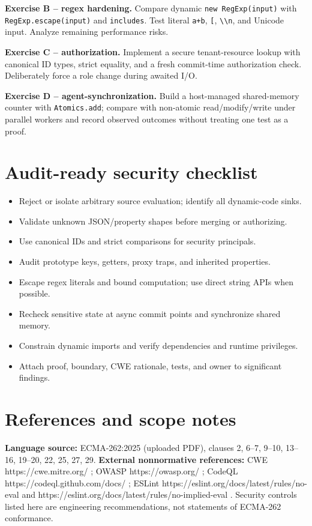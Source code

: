 \documentclass[11pt,letterpaper]{article}
\providecommand{\tightlist}{\setlength{\itemsep}{0pt}\setlength{\parskip}{0pt}}
\newcommand{\passthrough}[1]{#1}
\begin{document}
\textbf{Exercise B -- regex hardening.} Compare dynamic \passthrough{\lstinline!new RegExp(input)!} with \passthrough{\lstinline!RegExp.escape(input)!} and \passthrough{\lstinline!includes!}. Test literal \passthrough{\lstinline!a+b!}, \passthrough{\lstinline![!}, \passthrough{\lstinline!\\n!}, and Unicode input. Analyze remaining performance risks.

\textbf{Exercise C -- authorization.} Implement a secure tenant-resource lookup with canonical ID types, strict equality, and a fresh commit-time authorization check. Deliberately force a role change during awaited I/O.

\textbf{Exercise D -- agent-synchronization.} Build a host-managed shared-memory counter with \passthrough{\lstinline!Atomics.add!}; compare with non-atomic read/modify/write under parallel workers and record observed outcomes without treating one test as a proof.

\section{Audit-ready security checklist}\label{audit-ready-security-checklist}

\begin{itemize}
\tightlist
\item[$\square$]
  Reject or isolate arbitrary source evaluation; identify all dynamic-code sinks.
\item[$\square$]
  Validate unknown JSON/property shapes before merging or authorizing.
\item[$\square$]
  Use canonical IDs and strict comparisons for security principals.
\item[$\square$]
  Audit prototype keys, getters, proxy traps, and inherited properties.
\item[$\square$]
  Escape regex literals and bound computation; use direct string APIs when possible.
\item[$\square$]
  Recheck sensitive state at async commit points and synchronize shared memory.
\item[$\square$]
  Constrain dynamic imports and verify dependencies and runtime privileges.
\item[$\square$]
  Attach proof, boundary, CWE rationale, tests, and owner to significant findings.
\end{itemize}

\section{References and scope notes}\label{references-and-scope-notes}

\textbf{Language source:} ECMA-262:2025 (uploaded PDF), clauses 2, 6--7, 9--10, 13--16, 19--20, 22, 25, 27, 29. \textbf{External nonnormative references:} CWE https://cwe.mitre.org/ ; OWASP https://owasp.org/ ; CodeQL https://codeql.github.com/docs/ ; ESLint https://eslint.org/docs/latest/rules/no-eval and https://eslint.org/docs/latest/rules/no-implied-eval . Security controls listed here are engineering recommendations, not statements of ECMA-262 conformance.
\end{document}
